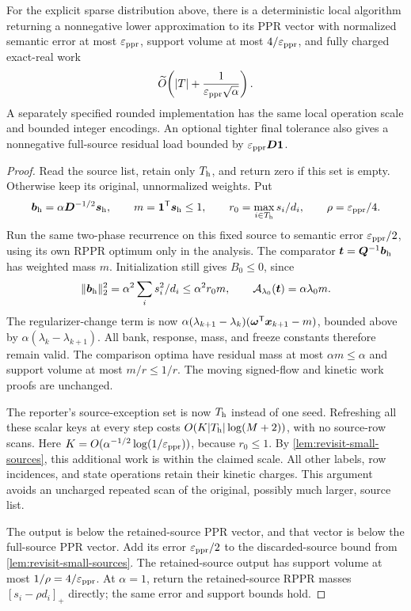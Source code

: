 \begin{theorem}
\label{thm:revisit-sparse-source}
For the explicit sparse distribution above, there is a deterministic local
algorithm returning a nonnegative lower approximation to its PPR vector
with normalized semantic error at most $\varepsilon_{\mathrm{ppr}}$, support volume at most
$4/\varepsilon_{\mathrm{ppr}}$, and fully charged exact-real work
\[
 \widetilde O\!\left(|T|+\frac1{\varepsilon_{\mathrm{ppr}}\sqrt\alpha}\right).
\]
A separately specified rounded implementation has the same local operation
scale and bounded integer encodings. An optional tighter final tolerance
also gives a nonnegative full-source residual load bounded by
$\varepsilon_{\mathrm{ppr}}\bm{D}\mathbf{1}$.
\end{theorem}
\begin{proof}
Read the source list, retain only $T_{\rm h}$, and return zero if this set
is empty. Otherwise keep its original, unnormalized weights. Put
\[
 \bm{b}_{\rm h}=\alpha\bm{D}^{-1/2}\bm{s}_{\rm h},\qquad
 m=\mathbf{1}^{\mathsf{T}}\bm{s}_{\rm h}\leq1,
 \qquad r_0=\max_{i\in T_{\rm h}}s_i/d_i,
 \qquad \rho=\varepsilon_{\mathrm{ppr}}/4.
\]
Run the same two-phase recurrence on this fixed source to semantic error
$\varepsilon_{\mathrm{ppr}}/2$, using its own RPPR optimum only in the analysis.
The comparator $\bm{t}=\bm{Q}^{-1}\bm{b}_{\rm h}$ has weighted mass $m$.
Initialization still gives $B_0\leq0$, since
\[
 \|\bm{b}_{\rm h}\|_2^2
    =\alpha^2\sum_i s_i^2/d_i\leq\alpha^2 r_0 m,
 \qquad \mathcal A_{\lambda_0}(\bm{t})=\alpha\lambda_0 m.
\]
The regularizer-change term is now
$\alpha(\lambda_{k+1}-\lambda_k)
(\bm{\omega}^{\mathsf{T}}\bm{x}_{k+1}-m)$, bounded above by
$\alpha(\lambda_k-\lambda_{k+1})$.
All bank, response, mass, and freeze constants therefore remain valid.
The comparison optima have residual mass at most $\alpha m\leq\alpha$
and support volume at most $m/r\leq1/r$. The moving signed-flow and
kinetic work proofs are unchanged.

The reporter's source-exception set is now $T_{\rm h}$ instead of one
seed. Refreshing all these scalar keys at every step costs
$O(K|T_{\rm h}|\log(M+2))$, with no source-row scans.
Here $K=O(\alpha^{-1/2}\log(1/\varepsilon_{\mathrm{ppr}}))$, because $r_0\leq1$.
By \cref{lem:revisit-small-sources}, this additional work is within the
claimed scale. All other labels, row incidences, and state operations retain
their kinetic charges. This argument avoids an uncharged repeated scan of
the original, possibly much larger, source list.

The output is below the retained-source PPR vector, and that vector is
below the full-source PPR vector. Add its error $\varepsilon_{\mathrm{ppr}}/2$ to the
discarded-source bound from \cref{lem:revisit-small-sources}.
The retained-source output has support volume at most $1/\rho=4/\varepsilon_{\mathrm{ppr}}$.
At $\alpha=1$, return the retained-source RPPR masses
$[s_i-\rho d_i]_+$ directly; the same error and support bounds hold.


\end{proof}
